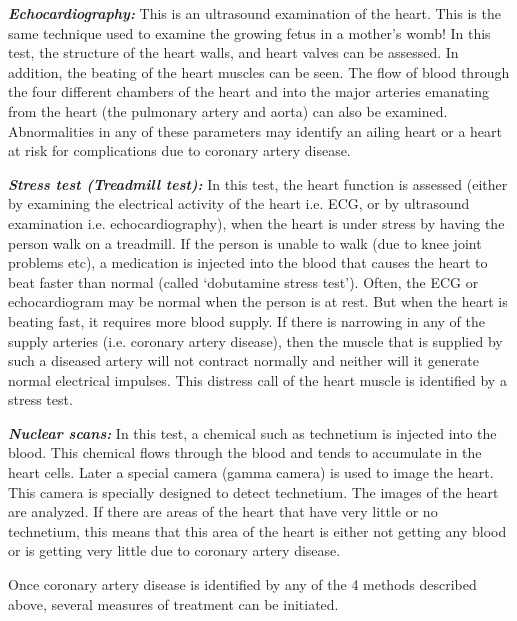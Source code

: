  \item \textbf{\textit{Echocardiography:}} This is an ultrasound examination of the heart. This is the same technique used to examine the growing fetus in a mother’s womb! In this test, the structure of the heart walls, and heart valves can be assessed. In addition, the beating of the heart muscles can be seen. The flow of blood through the four different chambers of the heart and into the major arteries emanating from the heart (the pulmonary artery and aorta) can also be examined. Abnormalities in any of these parameters may identify an ailing heart or a heart at risk for complications due to coronary artery disease.

 \item \textbf{\textit{Stress test (Treadmill test):}} In this test, the heart function is assessed (either by examining the electrical activity of the heart i.e. ECG, or by ultrasound examination i.e. echocardiography), when the heart is under stress by having the person walk on a treadmill. If the person is unable to walk (due to knee joint problems etc), a medication is injected into the blood that causes the heart to beat faster than normal (called ‘dobutamine stress test’). Often, the ECG or echocardiogram may be normal when the person is at rest. But when the heart is beating fast, it requires more blood supply. If there is narrowing in any of the supply arteries (i.e. coronary artery disease), then the muscle that is supplied by such a diseased artery will not contract normally and neither will it generate normal electrical impulses. This distress call of the heart muscle is identified by a stress test.

 \item \textbf{\textit{Nuclear scans:}} In this test, a chemical such as technetium is injected into the blood. This chemical flows through the blood and tends to accumulate in the heart cells. Later a special camera (gamma camera) is used to image the heart. This camera is specially designed to detect technetium. The images of the heart are analyzed. If there are areas of the heart that have very little or no technetium, this means that this area of the heart is either not getting any blood or is getting very little due to coronary artery disease.

Once coronary artery disease is identified by any of the 4 methods described above, several measures of treatment can be initiated.


